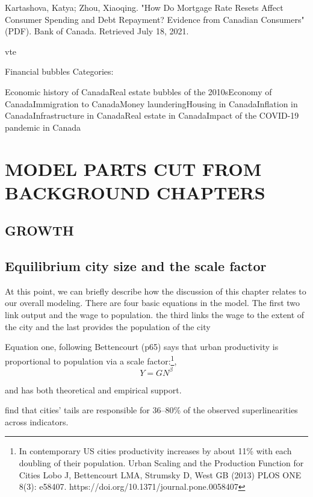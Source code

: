     Kartashova, Katya; Zhou, Xiaoqing. "How Do Mortgage Rate Resets Affect Consumer Spending and Debt Repayment? Evidence from Canadian Consumers" (PDF). Bank of Canada. Retrieved July 18, 2021.

    vte

Financial bubbles
Categories:

    Economic history of CanadaReal estate bubbles of the 2010sEconomy of CanadaImmigration to CanadaMoney launderingHousing in CanadaInflation in CanadaInfrastructure in CanadaReal estate in CanadaImpact of the COVID-19 pandemic in Canada

\chapter{MODEL PARTS CUT FROM BACKGROUND CHAPTERS}

\section{GROWTH}

\section{Equilibrium city size and the scale factor} 
At this point, we can briefly describe how the discussion of this chapter relates to our overall modeling. There are four basic equations in the model. The first two link output and the wage to population. the third links the wage to the extent of the city and the last  provides the population of the city

Equation one, following Bettencourt (p65) says that  urban productivity is proportional to population via a scale factor:\footnote{ In contemporary US cities productivity increases by about 11\% with each doubling of their population.  Urban Scaling and the Production Function for Cities Lobo J, Bettencourt LMA, Strumsky D, West GB (2013) PLOS ONE 8(3): e58407. https://doi.org/10.1371/journal.pone.0058407 }, 
\[Y= GN^{\beta}\]  

and has both theoretical and empirical support. 


\cite{arvidssonUrbanScalingLaws2023} find that cities' tails are responsible for 36--80\% of the observed superlinearities across indicators. 


